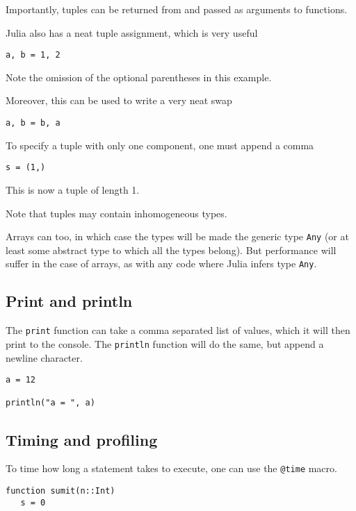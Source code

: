 \documentclass[a4paper,10pt]{article}
\newcommand{\code}{\lstinline}
\begin{document}
{{{{Importantly, tuples can be returned from and passed as arguments to functions.

Julia also has a neat tuple assignment, which is very useful

\begin{lstlisting}
a, b = 1, 2
\end{lstlisting}

Note the omission of the optional parentheses in this example.

Moreover, this can be used to write a very neat swap

\begin{lstlisting}
a, b = b, a
\end{lstlisting}

To specify a tuple with only one component, one must append a comma

\begin{lstlisting}
s = (1,)
\end{lstlisting}

This is now a tuple of length 1.

Note that tuples may contain inhomogeneous types. 

Arrays can too, in which case the types will be made the generic type \code{Any} (or
at least some abstract type to which all the types belong). 
But performance will suffer in the case of arrays, as with any code where Julia infers
type \code{Any}.

\subsection{Print and println}

The \code{print} function can take a comma separated list of values, which it will
then print to the console. The \code{println} function will do the same, but append
a newline character.

\begin{lstlisting}
a = 12

println("a = ", a)
\end{lstlisting}

\subsection{Timing and profiling}

To time how long a statement takes to execute, one can use the \code{@time} macro.

\begin{lstlisting}
function sumit(n::Int)
   s = 0


\end{lstlisting}}}}}
\end{document}
